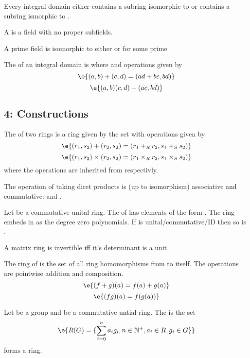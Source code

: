 \begin{Le} Every integral domain either contains a subring isomorphic to  or contains a subring ismorphic to .
\begin{D} A  is a field with no proper subfields. \end{D}
\begin{Le} A prime field is isomorphic to either  or  for some prime  \end{Le}
\begin{D} The  of an integral domain  is   where  and operations given by 
$$\e{(a,b)+(c,d) = (ad+bc,bd)}$$
$$\e{(a,b)(c,d)-(ac,bd)}$$
\end{D}











\subsection{4: Constructions}
\begin{Le} The   of two rings is a ring given by the set  with operations given by 
$$\e{(r_1,s_2)+(r_2,s_2)=(r_1+_R r_2,s_1+_S s_2)}$$
$$\e{(r_1,s_2)\times (r_2,s_2)=(r_1\times_R r_2,s_1\times_S s_2)}$$ where the operations \e{$+,\times $} are inherited from  respectivly. \end{Le} The operation of taking diret products is (up to isomorphism) associative and commutative:  and .

\begin{D} Let  be a commutative unital ring. The  of has elements of the form . The ring  embeds in  as the degree zero polynomials. If  is unital/commutative/ID then so is . \end{D}

\begin{D} A matrix ring is invertible iff it's determinant is a unit \end{D}
\begin{D} The ring of  is the set of all ring homomorphisms from  to itself. The operations are pointwise addition and composition. 
$$\e{(f+g)(a)=f(a)+g(a)}$$
$$\e{(fg)(a) = f(g(a))}$$
\end{D}
\begin{D} Let  be a group and  be a commutative untial ring. The  is the set 
$$\e{R(G) = \{\sum_{i=0}^n a_ig_i, n\in \mathbb{N}^+, a_i\in R, g_i\in G\}}$$
 forms a ring. \end{D}


\end{Le}
